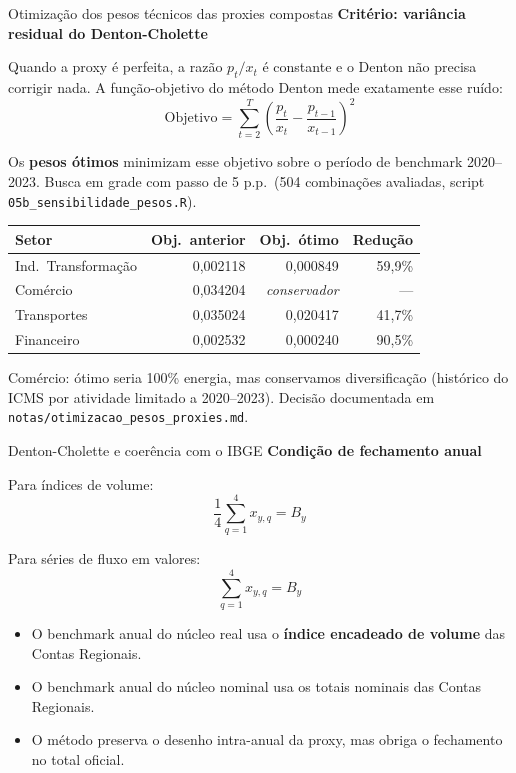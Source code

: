 \documentclass[aspectratio=169,11pt]{beamer}
\begin{document}
\begin{frame}{Otimização dos pesos técnicos das proxies compostas}
\textbf{Critério: variância residual do Denton-Cholette}

\vspace{0.1cm}
Quando a proxy é perfeita, a razão $p_t / x_t$ é constante e o Denton não precisa corrigir nada. A função-objetivo do método Denton mede exatamente esse ruído:
\[
\text{Objetivo} = \sum_{t=2}^{T} \left(\frac{p_t}{x_t} - \frac{p_{t-1}}{x_{t-1}}\right)^2
\]

Os \textbf{pesos ótimos} minimizam esse objetivo sobre o período de benchmark 2020--2023. Busca em grade com passo de 5 p.p.\ (504 combinações avaliadas, script \texttt{05b\_sensibilidade\_pesos.R}).

\vspace{0.2cm}
\small
\begin{tabular}{lrrr}
\toprule
\textbf{Setor} & \textbf{Obj.\ anterior} & \textbf{Obj.\ ótimo} & \textbf{Redução} \\
\midrule
Ind.\ Transformação & 0,002118 & 0,000849 & 59,9\% \\
Comércio & 0,034204 & \emph{conservador} & --- \\
Transportes & 0,035024 & 0,020417 & 41,7\% \\
Financeiro & 0,002532 & 0,000240 & 90,5\% \\
\bottomrule
\end{tabular}

\vspace{0.15cm}
\scriptsize Comércio: ótimo seria 100\% energia, mas conservamos diversificação (histórico do ICMS por atividade limitado a 2020--2023). Decisão documentada em \texttt{notas/otimizacao\_pesos\_proxies.md}.
\end{frame}

\begin{frame}{Denton-Cholette e coerência com o IBGE}
\textbf{Condição de fechamento anual}

Para índices de volume:
\[
\frac{1}{4}\sum_{q=1}^{4} x_{y,q} = B_y
\]

Para séries de fluxo em valores:
\[
\sum_{q=1}^{4} x_{y,q} = B_y
\]

\vspace{0.2cm}
\begin{itemize}
  \item O benchmark anual do núcleo real usa o \textbf{índice encadeado de volume} das Contas Regionais.
  \item O benchmark anual do núcleo nominal usa os totais nominais das Contas Regionais.
  \item O método preserva o desenho intra-anual da proxy, mas obriga o fechamento no total oficial.
\end{itemize}
\end{frame}
\end{document}
